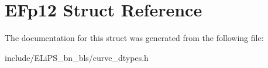 \hypertarget{struct_e_fp12}{}\section{E\+Fp12 Struct Reference}
\label{struct_e_fp12}


The documentation for this struct was generated from the following file\+:\begin{DoxyCompactItemize}
\item 
include/\+E\+Li\+P\+S\+\_\+bn\+\_\+bls/curve\+\_\+dtypes.\+h\end{DoxyCompactItemize}
